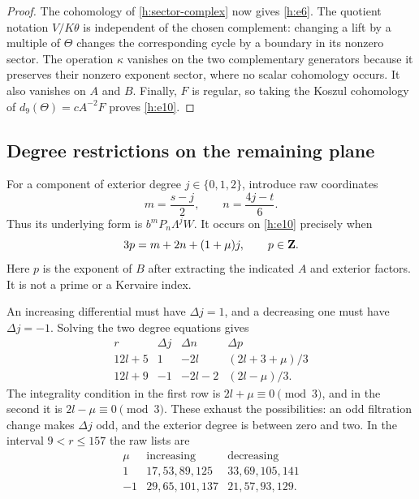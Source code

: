 \begin{proof}
The cohomology of \eqref{h:sector-complex} now gives
\eqref{h:e6}. The quotient notation $V/K\theta$ is independent of
the chosen complement: changing a lift by a multiple of $\Theta$
changes the corresponding cycle by a boundary in its nonzero sector.
The operation $\kappa$ vanishes on the two complementary generators
because it preserves their nonzero exponent sector, where no scalar
cohomology occurs. It also vanishes on $A$ and $B$. Finally, $F$ is
regular, so taking the Koszul cohomology of
$d_9(\Theta)=cA^{-2}F$ proves \eqref{h:e10}.
\end{proof}

\subsection{Degree restrictions on the remaining plane}

For a component of exterior degree $j\in\{0,1,2\}$, introduce raw
coordinates
\begin{equation}
 \label{h:raw-coordinates}
 m=\frac{s-j}{2},\qquad n=\frac{4j-t}{6}.
\end{equation}
Thus its underlying form is $b^mP_n\Lambda^jW$. It occurs on
\eqref{h:e10} precisely when
\begin{equation}
 \label{h:p-coordinate}
 3p=m+2n+(1+\mu)j,\qquad p\in\mathbf Z.
\end{equation}
Here $p$ is the exponent of $B$ after extracting the indicated $A$
and exterior factors. It is not a prime or a Kervaire index.

An increasing differential must have $\Delta j=1$, and a decreasing
one must have $\Delta j=-1$. Solving the two degree equations gives
\begin{equation}
 \label{h:degree-rules}
 \begin{array}{c|ccc}
  r&\Delta j&\Delta n&\Delta p\\\hline
  12l+5&1&-2l&(2l+3+\mu)/3\\
  12l+9&-1&-2l-2&(2l-\mu)/3.
 \end{array}
\end{equation}
The integrality condition in the first row is
$2l+\mu\equiv0\pmod3$, and in the second it is
$2l-\mu\equiv0\pmod3$. These exhaust the possibilities: an odd
filtration change makes $\Delta j$ odd, and the exterior degree is
between zero and two. In the interval $9<r\leq157$ the raw lists are
\begin{equation}
 \label{h:length-table}
 \begin{array}{c|l|l}
  \mu&\text{increasing}&\text{decreasing}\\\hline
  1&17,53,89,125&33,69,105,141\\
  -1&29,65,101,137&21,57,93,129.
 \end{array}
\end{equation}

